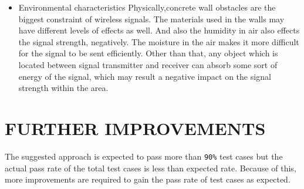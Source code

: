 \begin{itemize}
	\item Environmental characteristics
	\subitem Physically,concrete wall obstacles are the biggest constraint of wireless signals. The materials used in the walls may have different levels of effects as well. And also the humidity in air also effects the signal strength, negatively. The moisture in the air makes it more difficult for the signal to be sent efficiently.\cite{humidity_issue} Other than that, any object which is located between signal transmitter and receiver can absorb some sort of energy of the signal, which may result a negative impact on the signal strength within the area.
\end{itemize}  


\section{FURTHER IMPROVEMENTS}
The suggested approach is expected to pass more than \verb|90%| test cases but the actual pass rate of the total test cases is less than expected rate. Because of this, more improvements are required to gain the pass rate of test cases as expected.

